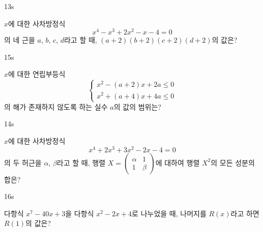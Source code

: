 \documentclass[10pt]{article}
\begin{document}
\begin{pagepair}
\noindent
\begin{minipage}[t][\probboxheight][t]{0.46\linewidth}
\begin{problem}{13}{s}
\par\smallskip
$x$에 대한 사차방정식
\[ x^4 - x^3 + 2x^2 - x - 4 = 0 \]
의 네 근을 $a$, $b$, $c$, $d$라고 할 때, $(a + 2)(b + 2)(c + 2)(d + 2)$의 값은?
\begin{choices}
\end{choices}
\end{problem}
\end{minipage}\hfill
\begin{minipage}[t][\probboxheight][t]{0.46\linewidth}
\begin{problem}{15}{s}
\par\smallskip
$x$에 대한 연립부등식
\[ \begin{cases} x^2 - (a + 2)x + 2a \le 0 \\ x^2 + (a + 4)x + 4a \le 0 \end{cases} \]
의 해가 존재하지 않도록 하는 실수 $a$의 값의 범위는?
\begin{choices}
\end{choices}
\end{problem}
\end{minipage}
\par\vspace{4mm}
\noindent
\begin{minipage}[t][\probboxheight][t]{0.46\linewidth}
\begin{problem}{14}{s}
\par\smallskip
$x$에 대한 사차방정식
\[ x^4 + 2x^3 + 3x^2 - 2x - 4 = 0 \]
의 두 허근을 $\alpha$, $\beta$라고 할 때, 행렬 $X = \begin{pmatrix} \alpha & 1 \\ 1 & \beta \end{pmatrix}$에 대하여 행렬 $X^2$의 모든 성분의 합은?
\begin{choices}
\end{choices}
\end{problem}
\end{minipage}\hfill
\begin{minipage}[t][\probboxheight][t]{0.46\linewidth}
\begin{problem}{16}{s}
\par\smallskip
다항식 $x^7 - 40x + 3$을 다항식 $x^2 - 2x + 4$로 나누었을 때, 나머지를 $R(x)$라고 하면 $R(1)$의 값은?
\begin{choices}
\end{choices}
\end{problem}
\end{minipage}
\end{pagepair}
\end{document}
